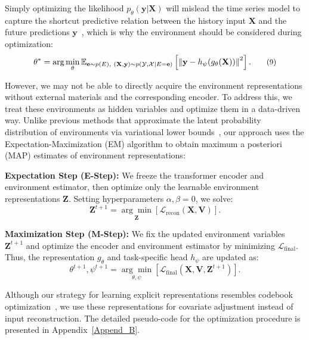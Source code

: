 Simply optimizing the likelihood $p_\theta(\mathbf{y}|\mathbf{X})$ will mislead the time series model to capture the shortcut predictive relation between the history input $\mathbf{X}$ and the future predictions $\mathbf{y}$~\cite{wu2024graph}, which is why the environment should be considered during optimization:
\begin{equation}
\small
\theta^* = \arg\min_\theta \mathbb{E}_{\mathbf{e} \sim p(E),\ (\mathbf{X}, \mathbf{y}) \sim p(\mathcal{Y}, \mathcal{X} \mid E=\mathbf{e})} \left[ \left\| \mathbf{y} - h_\psi(g_\theta(\mathbf{X})) \right\|^2 \right].  \tag{9}
\end{equation}

However, we may not be able to directly acquire the environment representations without external materials and the corresponding encoder. To address this, we treat these environments as hidden variables and optimize them in a data-driven way. Unlike previous methods that approximate the latent probability distribution of environments via variational lower bounds~\cite{wu2024graph}, our approach uses the Expectation-Maximization (EM) algorithm to obtain maximum a posteriori (MAP) estimates of environment representations:

\textbf{Expectation Step (E-Step):} We freeze the transformer encoder and environment estimator, then optimize only the learnable environment representations $\mathbf{Z}$. Setting hyperparameters $\alpha, \beta = 0$, we solve:
\begin{equation}
\mathbf{Z}^{t+1} = \underset{\mathbf{Z}}{\arg\min} \left[ \mathcal{L}_{\text{recon}}(\mathbf{X}, \mathbf{V}) \right]. \tag{10}
\end{equation}
\vspace{-3mm}

\textbf{Maximization Step (M-Step):} We fix the updated environment variables $\mathbf{Z}^{t+1}$ and optimize the encoder and environment estimator by minimizing $\mathcal{L}_{\text{final}}$. Thus, the representation $g_\theta$ and task-specific head $h_\psi$ are updated as:
\begin{equation}
\theta^{t+1}, \psi^{t+1} = \underset{\theta, \psi}{\arg\min} \left[ \mathcal{L}_{\text{final}}(\mathbf{X}, \mathbf{V}, \mathbf{Z}^{t+1}) \right]. \tag{11}
\end{equation}
\vspace{-3mm}

Although our strategy for learning explicit representations resembles codebook optimization~\cite{dong2023peco}, we use these representations for covariate adjustment instead of input reconstruction. The detailed pseudo-code for the optimization procedure is presented in Appendix~\ref{Append_B}.



